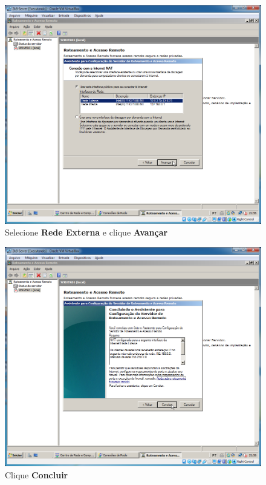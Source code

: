 \documentclass[10pt]{article}
\begin{document}
\begin{figure}[H]
    \centering
    \caption{Selecione \textbf{Rede Externa} e clique \textbf{Avançar}}
    \label{fig:re032}
    \includegraphics[width=\linewidth]{images/rede_externa/re032.png}
\end{figure}
\begin{figure}[H]
    \centering
    \caption{Clique \textbf{Concluir}}
    \label{fig:re033}
    \includegraphics[width=\linewidth]{images/rede_externa/re033.png}
\end{figure}
\end{document}
